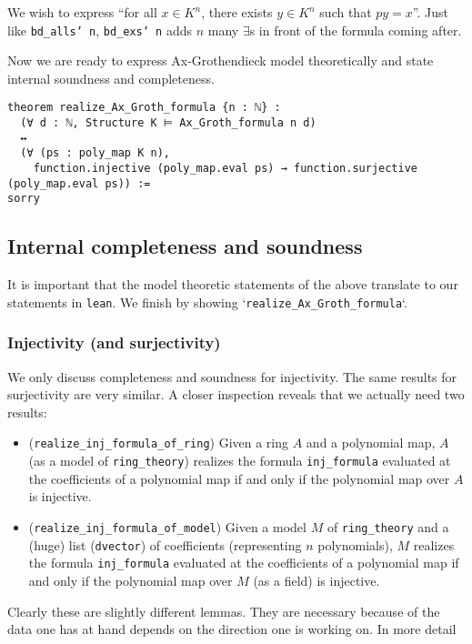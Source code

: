 We wish to express ``for all $x \in K^{n}$, there exists $y \in K^{n}$ such that $p y = x$''.
Just like \texttt{bd\_alls' n}, \texttt{bd\_exs' n} adds $n$ many $\exists$s in front of the
formula coming after.

Now we are ready to express Ax-Grothendieck model theoretically and state internal
soundness and completeness.
\begin{lstlisting}
theorem realize_Ax_Groth_formula {n : ℕ} :
  (∀ d : ℕ, Structure K ⊨ Ax_Groth_formula n d)
  ↔
  (∀ (ps : poly_map K n),
    function.injective (poly_map.eval ps) → function.surjective (poly_map.eval ps)) :=
sorry
\end{lstlisting}

\subsection{Internal completeness and soundness}

It is important that the model theoretic statements of the above translate to
our statements in \texttt{lean}. We finish by showing `\texttt{realize\_Ax\_Groth\_formula}`.

\subsubsection*{Injectivity (and surjectivity)}

We only discuss completeness and soundness for injectivity.
The same results for surjectivity are very similar.
A closer inspection reveals that we actually need two results:
\begin{itemize}
  \item (\texttt{realize\_inj\_formula\_of\_ring})
    Given a ring $A$ and a polynomial map,
    $A$ (as a model of \texttt{ring\_theory})
    realizes the formula \texttt{inj\_formula} evaluated at the coefficients
    of a polynomial map if and only if the polynomial map over $A$ is injective.
  \item (\texttt{realize\_inj\_formula\_of\_model})
    Given a model $M$ of \texttt{ring\_theory} and a (huge) list
    (\texttt{dvector}) of coefficients (representing $n$ polynomials),
    $M$ realizes the formula
    \texttt{inj\_formula} evaluated at the coefficients of a polynomial map
    if and only if the polynomial map over $M$ (as a field) is injective.
\end{itemize}

Clearly these are slightly different lemmas.
They are necessary because of the data one has at hand
depends on the direction one is working on.
In more detail

